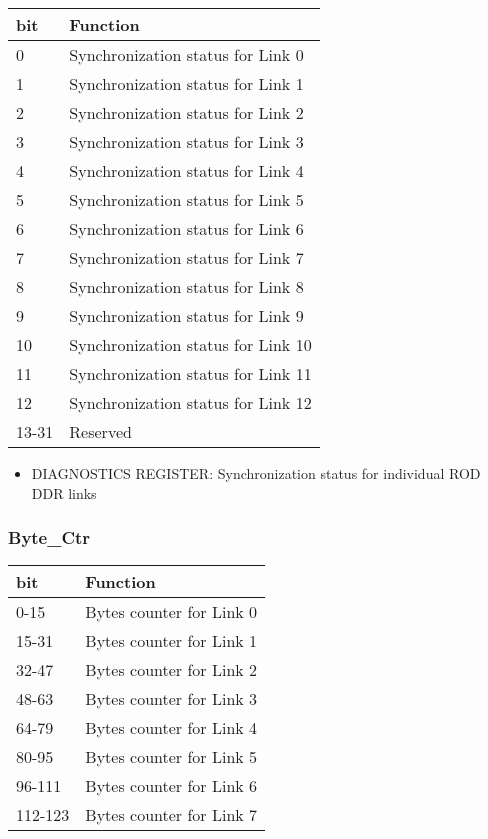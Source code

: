 \begin {table}[H]
\begin{center}
\begin{tabular}{|l|l|}
\hline
\textbf{bit} & \textbf{Function} \\
\hline
0 & Synchronization status for Link 0 \\
\hline
1 & Synchronization status for Link 1 \\
\hline
2 & Synchronization status for Link 2 \\
\hline
3 & Synchronization status for Link 3 \\
\hline
4 & Synchronization status for Link 4 \\
\hline
5 & Synchronization status for Link 5 \\
\hline
6 & Synchronization status for Link 6 \\
\hline
7 & Synchronization status for Link 7 \\
\hline
8 & Synchronization status for Link 8 \\
\hline
9 & Synchronization status for Link 9 \\
\hline
10 & Synchronization status for Link 10 \\
\hline
11 & Synchronization status for Link 11 \\
\hline
12 & Synchronization status for Link 12 \\
\hline
13-31 & Reserved \\
\hline
\end{tabular}
\end{center}
\end{table}


\begin{itemize}
\item DIAGNOSTICS REGISTER: Synchronization status for individual ROD DDR links
\end{itemize}




\subsubsection{Byte\_Ctr}

\begin {table}[H]
\begin{center}
\begin{tabular}{|l|l|}
\hline
\textbf{bit} & \textbf{Function} \\
\hline
0-15 & Bytes counter for Link 0 \\
\hline
15-31 & Bytes counter for Link 1 \\
\hline
32-47 & Bytes counter for Link 2 \\
\hline
48-63 & Bytes counter for Link 3 \\
\hline
64-79 & Bytes counter for Link 4 \\
\hline
80-95 & Bytes counter for Link 5 \\
\hline
96-111 & Bytes counter for Link 6 \\
\hline
112-123 & Bytes counter for Link 7 \\
\hline
\end{tabular}
\end{center}
\end{table}


